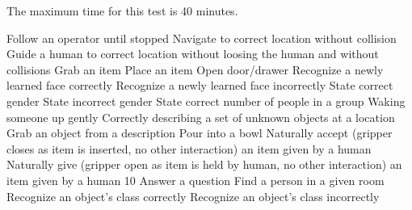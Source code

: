 The maximum time for this test is 40 minutes.
\begin{scorelist}
	
	 Follow an operator until stopped
	 Navigate to correct location without collision
	 Guide a human to correct location without loosing the human and without collisions
	 Grab an item
	 Place an item
	 Open door/drawer
	 Recognize a newly learned face correctly
	 Recognize a newly learned face incorrectly
	 State correct gender
	 State incorrect gender
	 State correct number of people in a group
	 Waking someone up gently
	 Correctly describing a set of unknown objects at a location
	 Grab an object from a description
	 Pour into a bowl
	 Naturally accept (gripper closes as item is inserted, no other interaction) an item given by a human
	 Naturally give (gripper open as item is held by human, no other interaction) an item given by a human
	10 Answer a question
	 Find a person in a given room
	 Recognize an object's class correctly
	 Recognize an object's class incorrectly
	
\end{scorelist}

